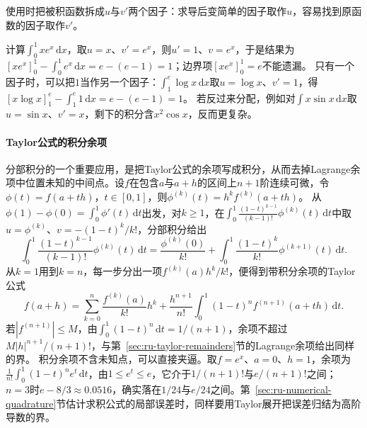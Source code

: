 使用时把被积函数拆成$u$与$v'$两个因子：求导后变简单的因子取作$u$，容易找到原函数的因子取作$v'$。


计算$\int_0^1xe^x\,\mathrm dx$，取$u=x$、$v'=e^x$，则$u'=1$、$v=e^x$，于是结果为$[xe^x]_0^1-\int_0^1e^x\,\mathrm dx=e-(e-1)=1$；边界项$[xe^x]_0^1=e$不能遗漏。
只有一个因子时，可以把$1$当作另一个因子：$\int_1^e\log x\,\mathrm dx$取$u=\log x$、$v'=1$，得$[x\log x]_1^e-\int_1^e1\,\mathrm dx=e-(e-1)=1$。
若反过来分配，例如对$\int x\sin x\,\mathrm dx$取$u=\sin x$、$v'=x$，剩下的积分含$x^2\cos x$，反而更复杂。

\paragraph{Taylor公式的积分余项}
分部积分的一个重要应用，是把Taylor公式的余项写成积分，从而去掉Lagrange余项中位置未知的中间点。设$f$在包含$a$与$a+h$的区间上$n+1$阶连续可微，令$\phi(t)=f(a+th)$，$t\in[0,1]$，则$\phi^{(k)}(t)=h^kf^{(k)}(a+th)$。
从$\phi(1)-\phi(0)=\int_0^1\phi'(t)\,\mathrm dt$出发，对$k\geq1$，在$\int_0^1\frac{(1-t)^{k-1}}{(k-1)!}\phi^{(k)}(t)\,\mathrm dt$中取$u=\phi^{(k)}$、$v=-(1-t)^k/k!$，分部积分给出
\[
 \int_0^1\frac{(1-t)^{k-1}}{(k-1)!}\phi^{(k)}(t)\,\mathrm dt=\frac{\phi^{(k)}(0)}{k!}+\int_0^1\frac{(1-t)^k}{k!}\phi^{(k+1)}(t)\,\mathrm dt.
\]
从$k=1$用到$k=n$，每一步分出一项$f^{(k)}(a)h^k/k!$，便得到带积分余项的Taylor公式
\begin{equation}
 f(a+h)=\sum_{k=0}^n\frac{f^{(k)}(a)}{k!}h^k+\frac{h^{n+1}}{n!}\int_0^1(1-t)^nf^{(n+1)}(a+th)\,\mathrm dt.
 \label{eq:ru-taylor-integral-remainder}
\end{equation}
若$|f^{(n+1)}|\leq M$，由$\int_0^1(1-t)^n\,\mathrm dt=1/(n+1)$，余项不超过$M|h|^{n+1}/(n+1)!$，与第~\ref{sec:ru-taylor-remainders}节的Lagrange余项给出同样的界。
积分余项不含未知点，可以直接夹逼。取$f=e^x$、$a=0$、$h=1$，余项为$\frac1{n!}\int_0^1(1-t)^ne^t\,\mathrm dt$，由$1\leq e^t\leq e$，它介于$1/(n+1)!$与$e/(n+1)!$之间；
$n=3$时$e-8/3\approx0.0516$，确实落在$1/24$与$e/24$之间。第~\ref{sec:ru-numerical-quadrature}节估计求积公式的局部误差时，同样要用Taylor展开把误差归结为高阶导数的界。
